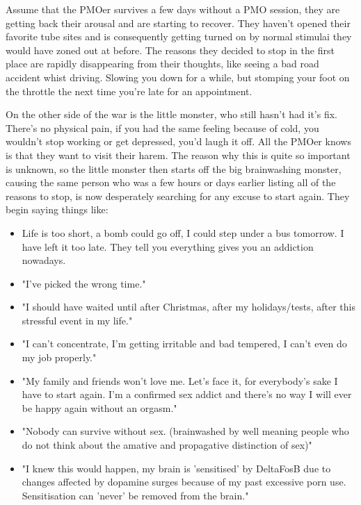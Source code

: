 \documentclass[easypeasy.tex]{subfiles}
\begin{document}
Assume that the PMOer survives a few days without a PMO session, they are getting back their arousal and are starting to recover. They haven't opened their favorite tube sites and is consequently getting turned on by normal stimulai they would have zoned out at before. The reasons they decided to stop in the first place are rapidly disappearing from their thoughts, like seeing a bad road accident whist driving. Slowing you down for a while, but stomping your foot on the throttle the next time you're late for an appointment.

On the other side of the war is the little monster, who still hasn't had it's fix. There's no physical pain, if you had the same feeling because of cold, you wouldn't stop working or get depressed, you'd laugh it off. All the PMOer knows is that they want to visit their harem. The reason why this is quite so important is unknown, so the little monster then starts off the big brainwashing monster, causing the same person who was a few hours or days earlier listing all of the reasons to stop, is now desperately searching for any excuse to start again. They begin saying things like:
\begin{itemize}

\item Life is too short, a bomb could go off, I could step under a bus tomorrow. I have left it too late. They tell you everything gives you an addiction nowadays.

\item "I've picked the wrong time."

\item "I should have waited until after Christmas, after my holidays/tests, after this stressful event in my life."

\item "I can't concentrate, I'm getting irritable and bad tempered, I can't even do my job properly."

\item "My family and friends won't love me. Let's face it, for everybody's sake I have to start again. I'm a confirmed sex addict and there's no way I will ever be happy again without an orgasm."

\item "Nobody can survive without sex. (brainwashed by well meaning people who do not think about the amative and propagative distinction of sex)"

\item "I knew this would happen, my brain is 'sensitised' by DeltaFosB due to changes affected by dopamine surges because of my past excessive porn use. Sensitisation can 'never' be removed from the brain."
\end{itemize}
\end{document}
